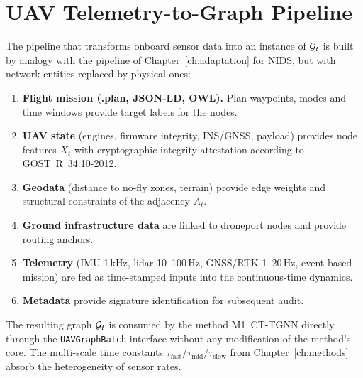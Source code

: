 \section{UAV Telemetry-to-Graph Pipeline}
\label{sec:uav_pipeline}

The pipeline that transforms onboard sensor data into an instance of
$\mathcal{G}_t$ is built by analogy with the pipeline of
Chapter~\ref{ch:adaptation} for NIDS, but with network entities
replaced by physical ones:

\begin{enumerate}\setlength\itemsep{0.15em}
\item \textbf{Flight mission (.plan, JSON-LD, OWL).} Plan waypoints,
modes and time windows provide target labels for the nodes.
\item \textbf{UAV state} (engines, firmware integrity, INS/GNSS,
payload) provides node features $X_t$ with cryptographic integrity
attestation according to \mbox{GOST~R~34.10-2012}.
\item \textbf{Geodata} (distance to no-fly zones, terrain) provide
edge weights and structural constraints of the adjacency $A_t$.
\item \textbf{Ground infrastructure data} are linked to droneport
nodes and provide routing anchors.
\item \textbf{Telemetry} (IMU 1\,kHz, lidar 10--100\,Hz, GNSS/RTK
1--20\,Hz, event-based mission) are fed as time-stamped inputs into
the continuous-time dynamics.
\item \textbf{Metadata} provide signature identification for
subsequent audit.
\end{enumerate}

The resulting graph $\mathcal{G}_t$ is consumed by the method
\textsf{M1~CT-TGNN} directly through the \texttt{UAVGraphBatch}
interface without any modification of the method's core. The
multi-scale time constants
$\tau_{\mathrm{fast}}/\tau_{\mathrm{mid}}/\tau_{\mathrm{slow}}$ from
Chapter~\ref{ch:methods} absorb the heterogeneity of sensor rates.

